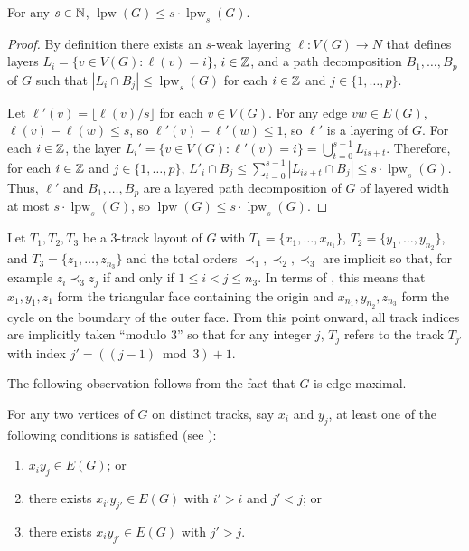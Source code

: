\documentclass{patmorin}
\DeclareMathOperator{\lpw}{lpw}
\begin{document}
\begin{lem}
  For any $s\in\mathbb{N}$, $\lpw(G) \le s\cdot\lpw_s(G)$.
\end{lem}

\begin{proof}
    By definition there exists an $s$-weak layering $\ell:V(G)\to N$ that defines layers $L_i=\{v\in V(G):\ell(v)=i\}$, $i\in\mathbb{Z}$, and a path decomposition $B_1,\ldots,B_p$ of $G$ such that $|L_i\cap B_j|\le \lpw_s(G)$ for each $i\in\mathbb{Z}$ and $j\in\{1,\ldots,p\}$.

    Let $\ell'(v)=\lfloor \ell(v)/s\rfloor$ for each $v\in V(G)$.  For any edge $vw\in E(G)$, $\ell(v)-\ell(w)\le s$, so $\ell'(v)-\ell'(w)\le 1$, so $\ell'$ is a layering of $G$.  For each $i\in\mathbb{Z}$, the layer $L_i'=\{v\in V(G):\ell'(v)=i\}=\bigcup_{t=0}^{s-1} L_{is+t}$.  Therefore, for each $i\in \mathbb{Z}$ and $j\in\{1,\ldots,p\}$, $L'_i\cap B_j\le\sum_{t=0}^{s-1} |L_{is+t}\cap B_j| \le s\cdot\lpw_s(G)$.  Thus, $\ell'$ and $B_1,\ldots,B_p$ are a layered path decomposition of $G$ of layered width at most $s\cdot\lpw_s(G)$, so $\lpw(G)\le s\cdot\lpw_s(G)$.
\end{proof}

Let $T_1,T_2,T_3$ be a 3-track layout of $G$ with
$T_1=\{x_1,\ldots,x_{n_1}\}$, $T_2=\{y_1,\ldots,y_{n_2}\}$, and
$T_3=\{z_1,\ldots,z_{n_3}\}$ and the total orders $\prec_1,\prec_2,\prec_3$
are implicit so that, for example $z_i\prec_3 z_j$ if and only if $1\le i<j\le n_3$.
In terms of , this means that $x_1,y_1,z_1$ form
the triangular face containing the origin and $x_{n_1},y_{n_2},z_{n_3}$
form the cycle on the boundary of the outer face.
From this point onward, all track indices are implicitly taken ``modulo 3''
so that for any integer $j$, $T_j$ refers to the track $T_{j'}$ with
index $j'=((j-1)\bmod 3)+1$.

The following observation follows from the fact that $G$ is edge-maximal.
\begin{obs}
  For any two vertices of $G$ on distinct tracks, say $x_i$ and $y_j$, at least
  one of the following conditions is satisfied (see ):
  \begin{enumerate}
    \item $x_{i}y_{j}\in E(G)$; or
    \item there exists $x_{i'}y_{j'} \in E(G)$ with $i'>i$ and $j'<j$; or
    \item there exists $x_{i}y_{j'}\in E(G)$ with $j'>j$.
  \end{enumerate}
\end{obs}
\end{document}
